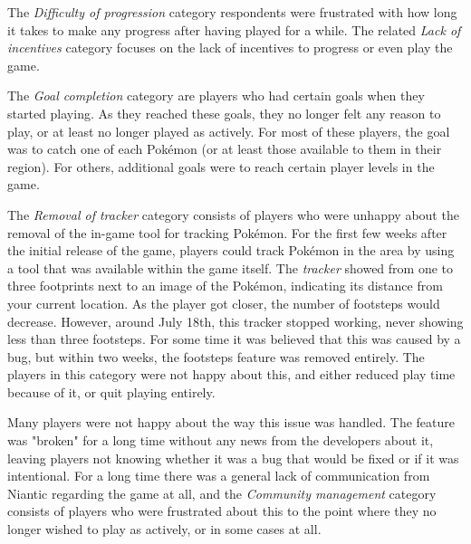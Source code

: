 The \emph{Difficulty of progression} category respondents were frustrated with how long it takes to make any progress after having played for a while. The related \emph{Lack of incentives} category focuses on the lack of incentives to progress or even play the game.

The \emph{Goal completion} category are players who had certain goals when they started playing. As they reached these goals, they no longer felt any reason to play, or at least no longer played as actively. For most of these players, the goal was to catch one of each Pokémon (or at least those available to them in their region). For others, additional goals were to reach certain player levels in the game.

The \emph{Removal of tracker} category consists of players who were unhappy about the removal of the in-game tool for tracking Pokémon. For the first few weeks after the initial release of the game, players could track Pokémon in the area by using a tool that was available within the game itself. The \emph{tracker} showed from one to three footprints next to an image of the Pokémon, indicating its distance from your current location. As the player got closer, the number of footsteps would decrease. However, around July 18th, this tracker stopped working, never showing less than three footsteps. For some time it was believed that this was caused by a bug, but within two weeks, the footsteps feature was removed entirely. The players in this category were not happy about this, and either reduced play time because of it, or quit playing entirely.

Many players were not happy about the way this issue was handled. The feature was "broken" for a long time without any news from the developers about it, leaving players not knowing whether it was a bug that would be fixed or if it was intentional. For a long time there was a general lack of communication from Niantic regarding the game at all, and the \emph{Community management} category consists of players who were frustrated about this to the point where they no longer wished to play as actively, or in some cases at all.


